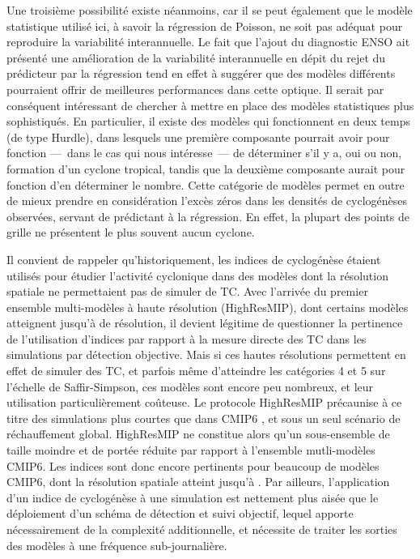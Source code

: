 \documentclass[../main.tex]{subfiles}
\begin{document}
Une troisième possibilité existe néanmoins, car il se peut également que le modèle statistique utilisé ici, à savoir la régression de Poisson, ne soit pas
adéquat pour reproduire la variabilité interannuelle. Le fait que l'ajout du diagnostic ENSO ait présenté une amélioration de la variabilité interannuelle en
dépit du rejet du prédicteur par la régression tend en effet à suggérer que des modèles différents pourraient offrir de meilleures performances dans cette
optique. Il serait par conséquent intéressant de chercher à mettre en place des modèles statistiques plus sophistiqués. En particulier, il existe des modèles
qui fonctionnent en deux temps (de type Hurdle), dans lesquels une première composante pourrait avoir pour fonction ---~dans le cas qui nous intéresse~--- de
déterminer s'il y a, oui ou non, formation d'un cyclone tropical, tandis que la deuxième composante aurait pour fonction d'en déterminer le nombre. Cette
catégorie de modèles permet en outre de mieux prendre en considération l'excès zéros dans les densités de cyclogénèses observées, servant de prédictant à la
régression. En effet, la plupart des points de grille ne présentent le plus souvent aucun cyclone. 

Il convient de rappeler qu'historiquement, les indices de cyclogénèse étaient utilisés pour étudier l'activité cyclonique dans des modèles dont la résolution
spatiale ne permettaient pas de simuler de TC. Avec l'arrivée du premier ensemble multi-modèles à haute résolution (HighResMIP), dont certains modèles
atteignent jusqu'à  de résolution, il devient légitime de questionner la pertinence de l'utilisation d'indices par rapport à la mesure directe des TC
dans les simulations par détection objective. Mais si ces hautes résolutions permettent en effet de simuler des TC, et parfois même d'atteindre les catégories 4
et 5 sur l'échelle de Saffir-Simpson, ces modèles sont encore peu nombreux, et leur utilisation particulièrement coûteuse. Le protocole HighResMIP précaunise à
ce titre des simulations plus courtes que dans CMIP6 \parencite[et plus particulièrement ScenarioMIP,][]{oneill_scenario_2016}, et sous un seul scénario de
réchauffement global. HighResMIP ne constitue alors qu'un sous-ensemble de taille moindre et de portée réduite par rapport à l'ensemble mutli-modèles CMIP6. Les
indices sont donc encore pertinents pour beaucoup de modèles CMIP6, dont la résolution spatiale atteint jusqu'à . Par ailleurs, l'application d'un
indice de cyclogénèse à une simulation est nettement plus aisée que le déploiement d'un schéma de détection et suivi objectif, lequel apporte nécessairement de
la complexité additionnelle, et nécessite de traiter les sorties des modèles à une fréquence sub-journalière.
\end{document}
